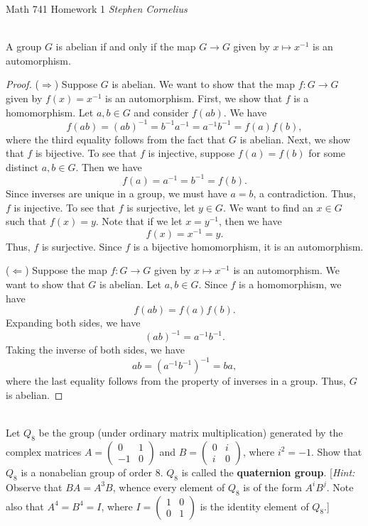 \documentclass{article}
\begin{document}
\begin{center}
    Math 741
    \hfill Homework 1
    \hfill \textit{Stephen Cornelius}
\end{center}

\begin{problem}[Exercise 1.2.2] \\
    A group $G$ is abelian if and only if the map $G \to G$ given by $x \mapsto x^{-1}$ is an automorphism.
\end{problem}

\begin{proof}
    ($\Rightarrow$) Suppose $G$ is abelian. We want to show that the map $f: G \to G$ given by $f(x) = x^{-1}$ is an automorphism. First, we show that $f$ is a homomorphism. Let $a,b \in G$ and consider $f(ab)$. We have
    \[
        f(ab) = (ab)^{-1} = b^{-1}a^{-1} = a^{-1}b^{-1} = f(a)f(b),
    \]
    where the third equality follows from the fact that $G$ is abelian. Next, we show that $f$ is bijective. To see that $f$ is injective, suppose $f(a) = f(b)$ for some distinct $a,b \in G$. Then we have
    \[
        f(a) = a^{-1} = b^{-1} = f(b).
    \]
    Since inverses are unique in a group, we must have $a = b$, a contradiction. Thus, $f$ is injective. To see that $f$ is surjective, let $y \in G$. We want to find an $x \in G$ such that $f(x) = y$. Note that if we let $x = y^{-1}$, then we have
    \[
        f(x) = x^{-1} = y.
    \]
    Thus, $f$ is surjective. Since $f$ is a bijective homomorphism, it is an automorphism.

    ($\Leftarrow$) Suppose the map $f: G \to G$ given by $x \mapsto x^{-1}$ is an automorphism. We want to show that $G$ is abelian. Let $a,b \in G$. Since $f$ is a homomorphism, we have
    \[
        f(ab) = f(a)f(b).
    \]
    Expanding both sides, we have
    \[
        (ab)^{-1} = a^{-1}b^{-1}.
    \]
    Taking the inverse of both sides, we have
    \[
        ab = (a^{-1}b^{-1})^{-1} = ba,
    \]
    where the last equality follows from the property of inverses in a group. Thus, $G$ is abelian.
\end{proof}


\begin{problem}[Exercise 1.2.3] \\
    Let $Q_8$ be the group (under ordinary matrix multiplication) generated by the complex matrices $A = \begin{pmatrix}
        0 & 1 \\
        -1 & 0
    \end{pmatrix}$ and $B = \begin{pmatrix}
        0 & i \\
        i & 0
    \end{pmatrix}$, where $i^2 = -1$. Show that $Q_8$ is a nonabelian group of order $8$. $Q_8$ is called the \textbf{quaternion group}. [\textit{Hint:} Observe that $BA = A^3B$, whence every element of $Q_8$ is of the form $A^i B^j$. Note also that $A^4 = B^4 = I$, where $I = \begin{pmatrix}
        1 & 0 \\
        0 & 1
    \end{pmatrix}$ is the identity element of $Q_8$.]
\end{problem}
\end{document}
